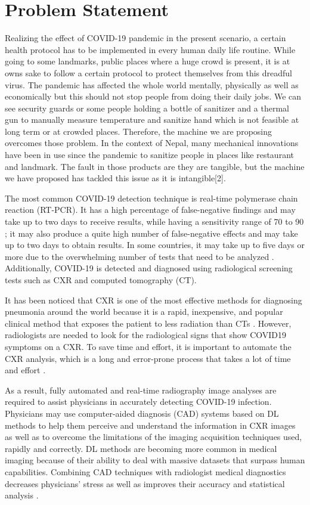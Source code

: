 \documentclass[a4paper,12pt]{report}
\begin{document}
\section{Problem Statement}
Realizing the effect of COVID-19 pandemic in the present scenario, a certain health protocol
has to be implemented in every human daily life routine. While going to some landmarks,
public places where a huge crowd is present, it is at owns sake to follow a certain protocol
to protect themselves from this dreadful virus. The pandemic has affected the whole world
mentally, physically as well as economically but this should not stop people from doing their
daily jobs. We can see security guards or some people holding a bottle of sanitizer and a
thermal gun to manually measure temperature and sanitize hand which is not feasible at
long term or at crowded places. Therefore, the machine we are proposing overcomes those
problem. In the context of Nepal, many mechanical innovations have been in use since
the pandemic to sanitize people in places like restaurant and landmark. The fault in those
products are they are tangible, but the machine we have proposed has tackled this issue as
it is intangible[2].

The most common COVID-19 detection technique is real-time polymerase chain
reaction (RT-PCR). It has a high percentage of false-negative findings and may take up
to two days to receive results, while having a sensitivity range of 70 to 90 \cite{ref9}; it may also
produce a quite high number of false-negative effects and may take up to two days to obtain
results. In some countries, it may take up to five days or more due to the overwhelming
number of tests that need to be analyzed \cite{ref4}.
Additionally, COVID-19 is detected and diagnosed using radiological screening tests
such as CXR and computed tomography (CT). 

It has been noticed that CXR is one of the
most effective methods for diagnosing pneumonia around the world because it is a rapid,
inexpensive, and popular clinical method that exposes the patient to less radiation than
CTs \cite{ref10,ref11}.
However, radiologists are needed to look for the radiological signs that show COVID19 symptoms on a CXR. To save time and effort, it is important to automate the CXR
analysis, which is a long and error-prone process that takes a lot of time and effort \cite{ref12}.

As a result, fully automated and real-time radiography image analyses are required
to assist physicians in accurately detecting COVID-19 infection. Physicians may use
computer-aided diagnosis (CAD) systems based on DL methods to help them perceive
and understand the information in CXR images as well as to overcome the limitations of
the imaging acquisition techniques used, rapidly and correctly. DL methods are becoming
more common in medical imaging because of their ability to deal with massive datasets
that surpass human capabilities. Combining CAD techniques with radiologist medical
diagnostics decreases physicians’ stress as well as improves their accuracy and statistical
analysis \cite{ref11}.
\end{document}
